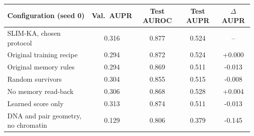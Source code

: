 \begin{tabular}{lcccc}
\toprule
Configuration (seed 0) & Val.\ AUPR & Test AUROC & Test AUPR & $\Delta$ AUPR \\
\midrule
SLIM-KA, chosen protocol & 0.316 & 0.877 & 0.524 & -- \\
Original training recipe & 0.294 & 0.872 & 0.524 & +0.000 \\
Original memory rules & 0.294 & 0.869 & 0.511 & -0.013 \\
Random survivors & 0.304 & 0.855 & 0.515 & -0.008 \\
No memory read-back & 0.306 & 0.868 & 0.528 & +0.004 \\
Learned score only & 0.313 & 0.874 & 0.511 & -0.013 \\
DNA and pair geometry, no chromatin & 0.129 & 0.806 & 0.379 & -0.145 \\
\bottomrule
\end{tabular}
